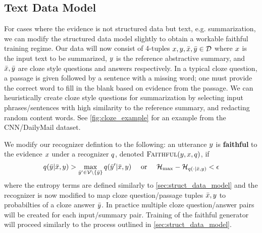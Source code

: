 \subsection{Text Data Model}
For cases where the evidence is not structured data but text, e.g. 
summarization, we can modify the structured data model slightly to obtain 
a workable faithful training regime. Our data will now consist of 
4-tuples $x, y, \bar{x}, \bar{y} \in 
\mathcal{D}$ where $x$ is the input text to be summarized, 
$y$ is the reference
abstractive summary, and $\bar{x}, \bar{y}$ are cloze
style questions and answers \citep{taylor1953cloze} respectively. In
a typical cloze question, a passage is given followed by a sentence with a 
missing word; one must provide the correct word to fill in the blank 
based
on evidence from the passage. We can heuristically create cloze style questions
for summarization by selecting input phrases/sentences with high similarity
to the reference summary, and redacting random content words. See 
\autoref{fig:cloze_example} for an example from the CNN/DailyMail dataset.




We modify our recognizer defintion to the following:
an utterance $y$ is \textbf{faithful}
 to the evidence $x$ under a recognizer $q$, 
denoted $\textsc{Faithful}(y,x,q)$, if
\[ q(\bar{y} |\bar{x}, y) >
 \max_{\bar{y}^\prime \in \mathcal{V} \setminus \{\bar{y}\}}
q(\bar{y}^\prime |\bar{x}, y)
  \quad \textrm{ or } \quad  
  \mathcal{H}_{\max} - \mathcal{H}_{q(\cdot|\bar{x}, y)} < \epsilon\]
where the entropy terms are defined similarly to 
\autoref{sec:struct_data_model} and the recognizer is now modified to map 
cloze question/passage tuples $\bar{x},y$ to probabilties
of a cloze answer
$\bar{y}$. In practice multiple cloze question/answer pairs will
be created for each input/summary pair. Training of the faithful generator
will proceed similarly to the process outlined in \autoref{sec:struct_data_model}.
